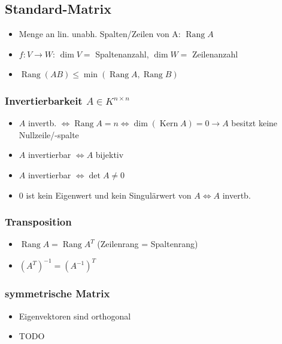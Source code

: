 \documentclass[german, fourcolumn, 8pt]{latex4ei/latex4ei_sheet}
\newcommand{\equival}[0]{\ensuremath{\Longleftrightarrow}}
\DeclareMathOperator{\Rang}{Rang}
\DeclareMathOperator{\Kern}{Kern}
\begin{document}
\begin{sectionbox}
    \subsection{Standard-Matrix}
    \begin{itemize}
        \item Menge an lin. unabh. Spalten/Zeilen von A: $\Rang A$
        \item $f: V \rightarrow W$: $\dim V=$ Spaltenanzahl, $\dim W=$ Zeilenanzahl
        \item $\Rang(AB) \le \min(\Rang A, \Rang B)$
    \end{itemize}

    \subsubsection{Invertierbarkeit $A \in K^{n\times n}$}
    \begin{itemize}
        \item $A$ invertb. $\equival \Rang A = n \equival \dim(\Kern A) = 0 \rightarrow A$ besitzt keine Nullzeile/-spalte
        \item $A$ invertierbar $\equival A$ bijektiv
        \item $A$ invertierbar $\equival \det A \ne 0$
        \item $0$ ist kein Eigenwert und kein Singulärwert von $A \equival A$ invertb.
    \end{itemize}

    \subsubsection{Transposition}
    \begin{itemize}
        \item $\Rang A=\Rang A^T$ (Zeilenrang = Spaltenrang)
        \item $(A^T)^{-1}=(A^{-1})^T$
    \end{itemize}

    \subsubsection{symmetrische Matrix}
    \begin{itemize}
        \item Eigenvektoren sind orthogonal
        \item TODO
    \end{itemize}


\end{sectionbox}
\end{document}

